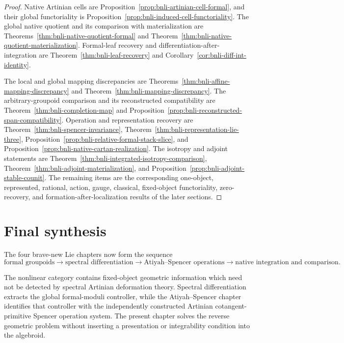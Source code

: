 \begin{proof}
Native Artinian cells are
Proposition~\ref{prop:bnli-artinian-cell-formal}, and their global
functoriality is Proposition~\ref{prop:bnli-induced-cell-functoriality}.
The global native quotient and its comparison with materialization are
Theorems~\ref{thm:bnli-native-quotient-formal} and
Theorem~\ref{thm:bnli-native-quotient-materialization}.  Formal-leaf recovery
and differentiation-after-integration are
Theorem~\ref{thm:bnli-leaf-recovery} and
Corollary~\ref{cor:bnli-diff-int-identity}.

The local and global mapping discrepancies are
Theorems~\ref{thm:bnli-affine-mapping-discrepancy} and
Theorem~\ref{thm:bnli-mapping-discrepancy}.  The arbitrary-groupoid
comparison and its reconstructed compatibility are
Theorem~\ref{thm:bnli-completion-map} and
Proposition~\ref{prop:bnli-reconstructed-span-compatibility}.  Operation and
representation recovery are
Theorem~\ref{thm:bnli-spencer-invariance},
Theorem~\ref{thm:bnli-representation-lie-three},
Proposition~\ref{prop:bnli-relative-formal-stack-slice}, and
Proposition~\ref{prop:bnli-native-cartan-realization}.  The isotropy and
adjoint statements are
Theorem~\ref{thm:bnli-integrated-isotropy-comparison},
Theorem~\ref{thm:bnli-adjoint-materialization}, and
Proposition~\ref{prop:bnli-adjoint-stable-counit}.  The remaining items are
the corresponding one-object, represented, rational, action, gauge,
classical, fixed-object functoriality, zero-recovery, and
formation-after-localization results of the later sections.
\end{proof}

\section{Final synthesis}
\label{sec:bnli-final-synthesis}

The four brave-new Lie chapters now form the sequence
\[
\boxed{
\text{formal groupoids}
\longrightarrow
\text{spectral differentiation}
\longrightarrow
\text{Atiyah--Spencer operations}
\longrightarrow
\text{native integration and comparison}.}
\]

The nonlinear category contains fixed-object geometric information which need
not be detected by spectral Artinian deformation theory.  Spectral
differentiation extracts the global formal-moduli controller, while the
Atiyah--Spencer chapter identifies that controller with the independently
constructed Artinian cotangent-primitive Spencer operation system.  The
present chapter solves the reverse geometric problem without inserting a
presentation or integrability condition into the algebroid.


